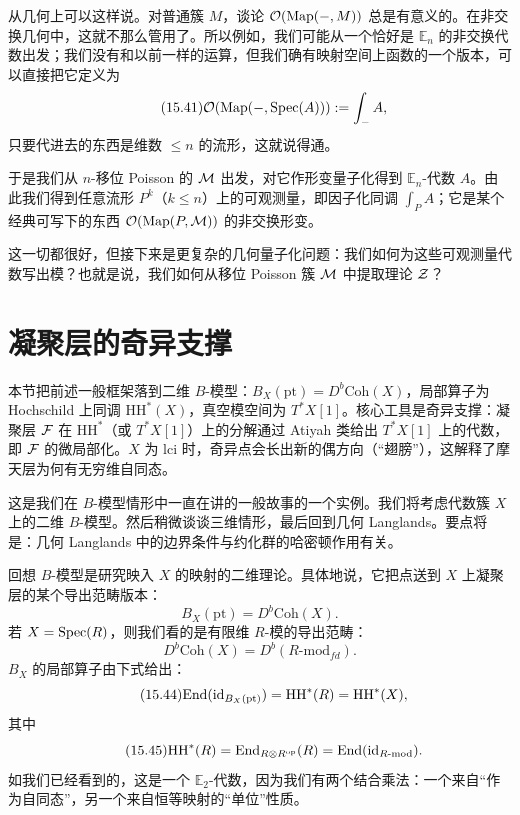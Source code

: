 从几何上可以这样说。对普通簇 $M$，谈论 $\mathcal{O}(\mathrm{Map}(-,M))$ 总是有意义的。在非交换几何中，这就不那么管用了。所以例如，我们可能从一个恰好是 $\mathbb{E}_n$ 的非交换代数出发；我们没有和以前一样的运算，但我们确有映射空间上函数的一个版本，可以直接把它定义为
\begin{equation}\tag{15.41}
\mathcal{O}(\mathrm{Map}(-,\mathrm{Spec}(A))):=\int_-A,
\end{equation}
只要代进去的东西是维数 $\le n$ 的流形，这就说得通。

于是我们从 $n$-移位 Poisson 的 $\mathcal{M}$ 出发，对它作形变量子化得到 $\mathbb{E}_n$-代数 $A$。由此我们得到任意流形 $P^k$（$k\le n$）上的可观测量，即因子化同调 $\int_P A$；它是某个经典可写下的东西 $\mathcal{O}(\mathrm{Map}(P,\mathcal{M}))$ 的非交换形变。

这一切都很好，但接下来是更复杂的几何量子化问题：我们如何为这些可观测量代数写出模？也就是说，我们如何从移位 Poisson 簇 $\mathcal{M}$ 中提取理论 $\mathcal{Z}$？

\section{凝聚层的奇异支撑}
\begin{sectionkey}
本节把前述一般框架落到二维 $B$-模型：$B_X(\mathrm{pt})=D^b\mathrm{Coh}(X)$，局部算子为 Hochschild 上同调 $\mathrm{HH}^*(X)$，真空模空间为 $T^*X[1]$。核心工具是奇异支撑：凝聚层 $\mathcal{F}$ 在 $\mathrm{HH}^*$（或 $T^*X[1]$）上的分解通过 Atiyah 类给出 $T^*X[1]$ 上的代数，即 $\mathcal{F}$ 的微局部化。$X$ 为 lci 时，奇异点会长出新的偶方向（“翅膀”），这解释了摩天层为何有无穷维自同态。
\end{sectionkey}

这是我们在 $B$-模型情形中一直在讲的一般故事的一个实例。我们将考虑代数簇 $X$ 上的二维 $B$-模型。然后稍微谈谈三维情形，最后回到几何 Langlands。要点将是：几何 Langlands 中的边界条件与约化群的哈密顿作用有关。

回想 $B$-模型是研究映入 $X$ 的映射的二维理论。具体地说，它把点送到 $X$ 上凝聚层的某个导出范畴版本：
\begin{equation}\tag{15.42}
B_X(\mathrm{pt})=D^b\mathrm{Coh}(X).
\end{equation}
若 $X=\mathrm{Spec}(R)$，则我们看的是有限维 $R$-模的导出范畴：
\begin{equation}\tag{15.43}
D^b\mathrm{Coh}(X)=D^b(R\text{-}\mathrm{mod}_{fd}).
\end{equation}
$B_X$ 的局部算子由下式给出：
\begin{equation}\tag{15.44}
\mathrm{End}(\mathrm{id}_{B_X(\mathrm{pt})})=\mathrm{HH}^*(R)=\mathrm{HH}^*(X),
\end{equation}
其中
\begin{equation}\tag{15.45}
\mathrm{HH}^*(R)=\mathrm{End}_{R\otimes R^{\mathrm{op}}}(R)=\mathrm{End}(\mathrm{id}_{R\text{-}\mathrm{mod}}).
\end{equation}
如我们已经看到的，这是一个 $\mathbb{E}_2$-代数，因为我们有两个结合乘法：一个来自“作为自同态”，另一个来自恒等映射的“单位”性质。

